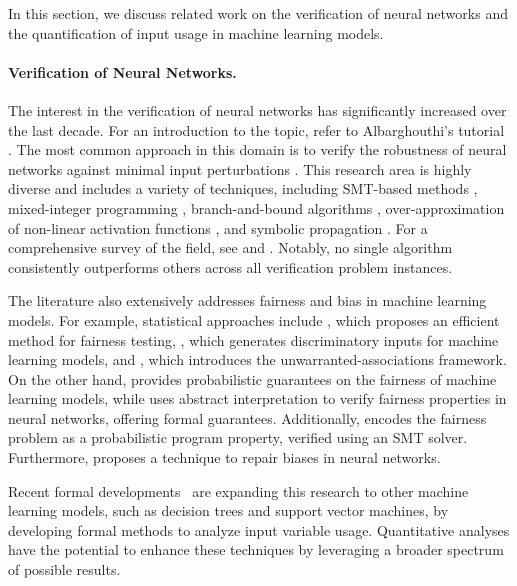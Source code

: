 In this section, we discuss related work on the verification of neural networks and the quantification of input usage in machine learning models.

\paragraph{Verification of Neural Networks.}

The interest in the verification of neural networks has significantly increased over the last decade. For an introduction to the topic, refer to Albarghouthi's tutorial .
The most common approach in this domain is to verify the robustness of neural networks against minimal input perturbations .
This research area is highly diverse and includes a variety of techniques, including SMT-based methods , mixed-integer programming , branch-and-bound algorithms , over-approximation of non-linear activation functions , and symbolic propagation .
For a comprehensive survey of the field, see  and .
Notably, no single algorithm consistently outperforms others across all verification problem instances.

The literature also extensively addresses fairness and bias in machine learning models.
For example, statistical approaches include , which proposes an efficient method for fairness testing, , which generates discriminatory inputs for machine learning models, and , which introduces the unwarranted-associations framework.
On the other hand,  provides probabilistic guarantees on the fairness of machine learning models, while  uses abstract interpretation to verify fairness properties in neural networks, offering formal guarantees.
Additionally,  encodes the fairness problem as a probabilistic program property, verified using an SMT solver.
Furthermore,  proposes a technique to repair biases in neural networks.

Recent formal developments~ are expanding this research to other machine learning models, such as decision trees and support vector machines, by developing formal methods to analyze input variable usage. Quantitative analyses have the potential to enhance these techniques by leveraging a broader spectrum of possible results.


